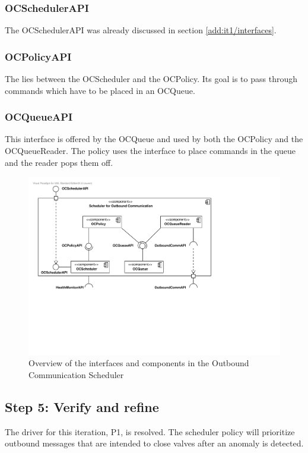 \subsubsection{OCSchedulerAPI}

\npar The OCSchedulerAPI was already discussed in section
\ref{add:it1/interfaces}.

\subsubsection{OCPolicyAPI}

\npar The  lies between the OCScheduler and the OCPolicy.
Its goal is to pass through commands which have to be placed in an OCQueue.

\subsubsection{OCQueueAPI}

\npar This interface is offered by the OCQueue and used by both the OCPolicy and
the OCQueueReader. The policy uses the interface to place commands in the queue
and the reader pops them off.

\begin{figure}[H]
	\begin{centering}
		\includegraphics[width=\textwidth]{figs/add-it7-interfaces.pdf}
		\caption{Overview of the interfaces and components in the
		Outbound Communication Scheduler}
		\label{fig:it7/interfaces}
	\end{centering}
\end{figure}

\subsection{Step 5: Verify and refine}
\label{add:it7/verification}

\npar The driver for this iteration, P1, is resolved. The scheduler policy will
prioritize outbound messages that are intended to close valves after an anomaly
is detected.
